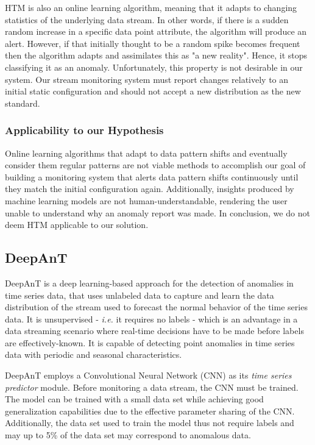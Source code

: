 HTM is also an online learning algorithm, meaning that it adapts to changing statistics of the underlying data stream. In other words, if there is a sudden random increase in a specific data point attribute, the algorithm will produce an alert. However, if that initially thought to be a random spike becomes frequent then the algorithm adapts and assimilates this as "a new reality". Hence, it stops classifying it as an anomaly. Unfortunately, this property is not desirable in our system. Our stream monitoring system must report changes relatively to an initial static configuration and should not accept a new distribution as the new standard.

\subsubsection*{Applicability to our Hypothesis}
Online learning algorithms that adapt to data pattern shifts and eventually consider them regular patterns are not viable methods to accomplish our goal of building a monitoring system that alerts data pattern shifts continuously until they match the initial configuration again. Additionally, insights produced by machine learning models are not human-understandable, rendering the user unable to understand why an anomaly report was made. In conclusion, we do not deem HTM applicable to our solution.

\subsection{DeepAnT}

DeepAnT \cite{Munir-DeepAnT} is a deep learning-based approach for the detection of anomalies in time series data, that uses unlabeled data to capture and learn the data distribution of the stream used to forecast the normal behavior of the time series data. It is unsupervised - \textit{i.e.} it requires no labels - which is an advantage in a data streaming scenario where real-time decisions have to be made before labels are effectively-known. It is capable of detecting point anomalies in time series data with periodic and seasonal characteristics.

DeepAnT employs a Convolutional Neural Network (CNN) as its \textit{time series predictor} module. Before monitoring a data stream, the CNN must be trained. The model can be trained with a small data set while achieving good generalization capabilities due to the effective parameter sharing of the CNN. Additionally, the data set used to train the model thus not require labels and may up to 5\% of the data set may correspond to anomalous data.

